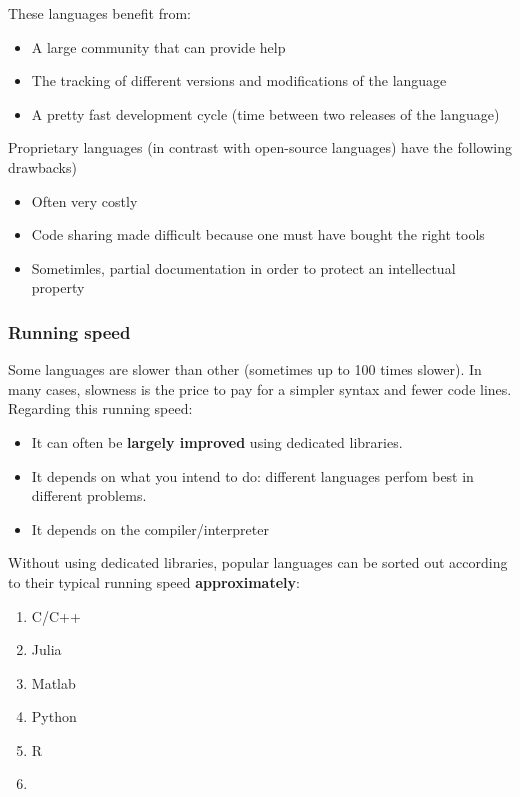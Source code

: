 \documentclass[11pt]{article}
\begin{document}
				These languages benefit from:
				\begin{itemize}
					\item A large community that can provide help
					\item The tracking of different versions and modifications of the language
					\item A pretty fast development cycle (time between two releases of the language)
				\end{itemize}
				Proprietary languages (in contrast with open-source languages) have the following drawbacks)
				\begin{itemize}
					\item Often very costly
					\item Code sharing made difficult because one must have bought the right tools
					\item Sometimles, partial documentation in order to protect an intellectual property
				\end{itemize}

			\subsubsection{Running speed}
				Some languages are slower than other (sometimes up to 100 times slower). In many cases, slowness is the price to pay for a simpler syntax and fewer code lines.
                Regarding this running speed:
				\begin{itemize}
					\item It can often be \textbf{largely improved} using dedicated libraries.
					\item It depends on what you intend to do: different languages perfom best in different problems.
					\item It depends on the compiler/interpreter
				\end{itemize}
				Without using dedicated libraries, popular languages can be sorted out according to their typical running speed \textbf{approximately}:

				\begin{multicols}{3}
					\begin{enumerate}
						\centering
						\item C/C++
						\item Julia
						\item Matlab
						\item Python
						\item R
						\item[\vspace{\fill}]
					\end{enumerate}
				\end{multicols}
\end{document}
